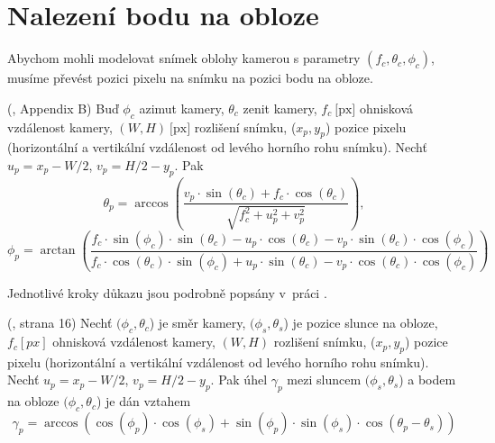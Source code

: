 \section{Nalezení bodu na obloze}
Abychom mohli modelovat snímek oblohy kamerou s parametry $(f_c, \theta_c, \phi_c)$, musíme převést pozici pixelu na snímku na pozici bodu na obloze.

\begin{lemma}\label{lemma01:2}(\citealp{Lalonde10}, Appendix B)
  Buď  $\phi_c$ azimut kamery, $\theta_c$ zenit kamery, $f_c~\text{[px]}$ ohnisková vzdálenost kamery, $(W, H)~\text{[px]}$ rozlišení snímku, ($x_p, y_p$) pozice pixelu (horizontální a vertikální vzdálenost od levého horního rohu snímku). Nechť $u_p = x_p - W/2$, $v_p = H/2 - y_p$. Pak
  \begin{equation}\label{eq01:2}
    \theta_p=\arccos \left( \frac{v_p \cdot \sin(\theta_c) + f_c \cdot \cos(\theta_c)}{\sqrt{f_c^2 + u_p^2 + v_p^2}} \right),
  \end{equation}
  \begin{equation}\label{eq01:3}
    \phi_p=\arctan \left( \frac{f_c \cdot \sin(\phi_c) \cdot \sin(\theta_c) - u_p \cdot \cos(\theta_c) - v_p \cdot \sin(\theta_c) \cdot \cos(\phi_c)}{f_c \cdot \cos(\theta_c) \cdot \sin(\phi_c) + u_p \cdot \sin(\theta_c) - v_p \cdot \cos(\theta_c) \cdot \cos(\phi_c)} \right)
  \end{equation}
\end{lemma}
\begin{dukaz}
  Jednotlivé kroky důkazu jsou podrobně popsány v~práci \citet[Appendix B]{Lalonde10}.
\end{dukaz}
  
\begin{lemma}\label{lemma01:3}(\citealp{Lalonde10}, strana 16)
  Nechť $(\phi_c, \theta_c$) je směr kamery, $(\phi_s, \theta_s$) je pozice slunce na obloze, $f_c[px]$ ohnisková vzdálenost kamery, $(W, H)$ rozlišení snímku, ($x_p, y_p$) pozice pixelu (horizontální a vertikální vzdálenost od levého horního rohu snímku). Nechť $u_p = x_p - W/2$, $v_p = H/2 - y_p$. Pak úhel $\gamma_p$ mezi sluncem $(\phi_s, \theta_s$) a bodem na obloze $(\phi_c, \theta_c$) je dán vztahem
  \begin{equation}\label{eq01:4}
    \gamma_p = \arccos \left( \cos(\phi_p) \cdot \cos(\phi_s) + \sin(\phi_p) \cdot \sin(\phi_s) \cdot \cos(\theta_p - \theta_s) \right)
  \end{equation}
\end{lemma}

